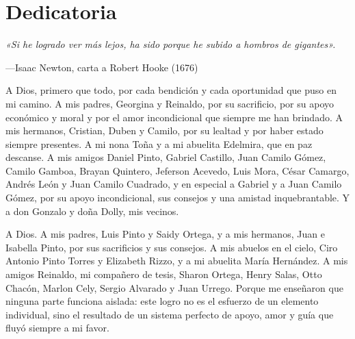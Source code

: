 \chapter*{Dedicatoria}

\begingroup
{}
\setlength{\parindent}{0pt}
\setlength{\parskip}{0.8em}

\begin{flushright}
\begin{minipage}{0.78\linewidth}
\raggedleft\itshape
«Si he logrado ver más lejos, ha sido porque he subido a hombros de gigantes».\par
\upshape ---Isaac Newton, carta a Robert Hooke (1676)
\end{minipage}
\end{flushright}

\vspace{1.2em}

A Dios, primero que todo, por cada bendición y cada oportunidad que puso en mi camino. A mis padres, Georgina y Reinaldo, por su sacrificio, por su apoyo económico y moral y por el amor incondicional que siempre me han brindado. A mis hermanos, Cristian, Duben y Camilo, por su lealtad y por haber estado siempre presentes. A mi nona Toña y a mi abuelita Edelmira, que en paz descanse. A mis amigos Daniel Pinto, Gabriel Castillo, Juan Camilo Gómez, Camilo Gamboa, Brayan Quintero, Jeferson Acevedo, Luis Mora, César Camargo, Andrés León y Juan Camilo Cuadrado, y en especial a Gabriel y a Juan Camilo Gómez, por su apoyo incondicional, sus consejos y una amistad inquebrantable. Y a don Gonzalo y doña Dolly, mis vecinos.

\begin{flushright}\textit{\AutorUno}\end{flushright}

\vspace{2em}

A Dios. A mis padres, Luis Pinto y Saidy Ortega, y a mis hermanos, Juan e Isabella Pinto, por sus sacrificios y sus consejos. A mis abuelos en el cielo, Ciro Antonio Pinto Torres y Elizabeth Rizzo, y a mi abuelita María Hernández. A mis amigos Reinaldo, mi compañero de tesis, Sharon Ortega, Henry Salas, Otto Chacón, Marlon Cely, Sergio Alvarado y Juan Urrego. Porque me enseñaron que ninguna parte funciona aislada: este logro no es el esfuerzo de un elemento individual, sino el resultado de un sistema perfecto de apoyo, amor y guía que fluyó siempre a mi favor.

\begin{flushright}\textit{\AutorDos}\end{flushright}

\endgroup
